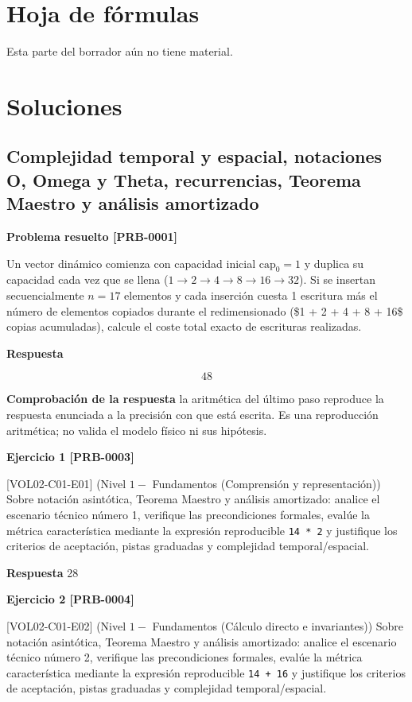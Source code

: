 \documentclass{book}
\begin{document}
\chapter{Hoja de fórmulas}

\noindent Esta parte del borrador aún no tiene material.
\chapter{Soluciones}

\section{Complejidad temporal y espacial, notaciones O, Omega y Theta, recurrencias, Teorema Maestro y análisis amortizado}

\noindent\textbf{Problema resuelto [PRB-0001]}

Un vector dinámico comienza con capacidad inicial \(\text{cap}_0 = 1\) y duplica su capacidad cada vez que se llena (\(1 \to 2 \to 4 \to 8 \to 16 \to 32\)). Si se insertan secuencialmente \(n = 17\) elementos y cada inserción cuesta 1 escritura más el número de elementos copiados durante el redimensionado (\$1 + 2 + 4 + 8 + 16\$ copias acumuladas), calcule el coste total exacto de escrituras realizadas.

\noindent\textbf{Respuesta}

\[
48
\]

\noindent\textbf{Comprobación de la respuesta} la aritmética del último paso reproduce la respuesta enunciada a la precisión con que está escrita. Es una reproducción aritmética; no valida el modelo físico ni sus hipótesis.

\noindent\textbf{Ejercicio 1 [PRB-0003]}

[VOL02-C01-E01] (Nivel \(1 -\) Fundamentos (Comprensión y representación)) Sobre notación asintótica, Teorema Maestro y análisis amortizado: analice el escenario técnico número 1, verifique las precondiciones formales, evalúe la métrica característica mediante la expresión reproducible \texttt{14 * 2} y justifique los criterios de aceptación, pistas graduadas y complejidad temporal/espacial.

\noindent\textbf{Respuesta} 28

\noindent\textbf{Ejercicio 2 [PRB-0004]}

[VOL02-C01-E02] (Nivel \(1 -\) Fundamentos (Cálculo directo e invariantes)) Sobre notación asintótica, Teorema Maestro y análisis amortizado: analice el escenario técnico número 2, verifique las precondiciones formales, evalúe la métrica característica mediante la expresión reproducible \texttt{14 + 16} y justifique los criterios de aceptación, pistas graduadas y complejidad temporal/espacial.
\end{document}
